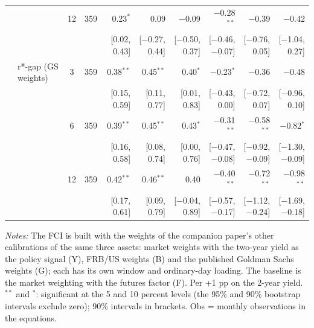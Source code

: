 \begin{longtable}{llcrrrrrrr}
 &  & 12 & 359 & 0.23$^{*}$ & 0.09 & $-$0.09 & $-$0.28$^{**}$ & $-$0.39 & $-$0.42\\
 & & & & {\scriptsize [0.02, 0.43]} & {\scriptsize [$-$0.27, 0.44]} & {\scriptsize [$-$0.50, 0.37]} & {\scriptsize [$-$0.46, $-$0.07]} & {\scriptsize [$-$0.76, 0.05]} & {\scriptsize [$-$1.04, 0.27]}\\
 & r*-gap (GS weights) & 3 & 359 & 0.38$^{**}$ & 0.45$^{**}$ & 0.40$^{*}$ & $-$0.23$^{*}$ & $-$0.36 & $-$0.48\\
 & & & & {\scriptsize [0.15, 0.59]} & {\scriptsize [0.11, 0.77]} & {\scriptsize [0.01, 0.83]} & {\scriptsize [$-$0.43, 0.00]} & {\scriptsize [$-$0.72, 0.07]} & {\scriptsize [$-$0.96, 0.10]}\\
 &  & 6 & 359 & 0.39$^{**}$ & 0.45$^{**}$ & 0.43$^{*}$ & $-$0.31$^{**}$ & $-$0.58$^{**}$ & $-$0.82$^{*}$\\
 & & & & {\scriptsize [0.16, 0.58]} & {\scriptsize [0.08, 0.74]} & {\scriptsize [0.00, 0.76]} & {\scriptsize [$-$0.47, $-$0.08]} & {\scriptsize [$-$0.92, $-$0.09]} & {\scriptsize [$-$1.30, $-$0.09]}\\
 &  & 12 & 359 & 0.42$^{**}$ & 0.46$^{**}$ & 0.40 & $-$0.40$^{**}$ & $-$0.72$^{**}$ & $-$0.98$^{**}$\\
 & & & & {\scriptsize [0.17, 0.61]} & {\scriptsize [0.09, 0.79]} & {\scriptsize [$-$0.04, 0.89]} & {\scriptsize [$-$0.57, $-$0.17]} & {\scriptsize [$-$1.12, $-$0.24]} & {\scriptsize [$-$1.69, $-$0.18]}\\
\end{longtable}
\begin{flushleft}\footnotesize\textit{Notes:} The FCI is built with the weights of the companion paper's other calibrations of the same three assets: market weights with the two-year yield as the policy signal (Y), FRB/US weights (B) and the published Goldman Sachs weights (G); each has its own window and ordinary-day loading. The baseline is the market weighting with the futures factor (F). Per +1 pp on the 2-year yield. $^{**}$ and $^{*}$: significant at the 5 and 10 percent levels (the 95\% and 90\% bootstrap intervals exclude zero); 90\% intervals in brackets. Obs = monthly observations in the equations.\end{flushleft}
\endgroup
